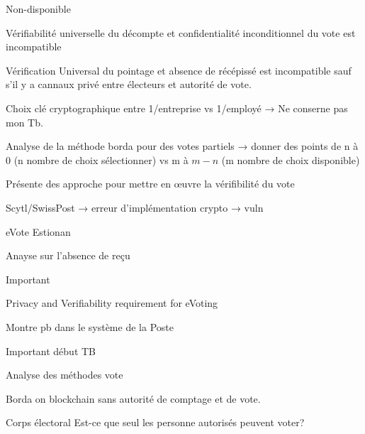 \documentclass[../report]{subfiles}
\begin{document}
  Non-disponible %

  Vérifiabilité universelle du décompte et confidentialité inconditionnel du vote est incompatible

  Vérification Universal du pointage et absence de récépissé est incompatible sauf s'il y a cannaux privé entre électeurs et autorité de vote.


  Choix clé cryptographique entre 1/entreprise vs 1/employé → Ne conserne pas mon Tb.


  Analyse de la méthode borda pour des votes partiels → donner des points de n à 0 (n nombre de choix sélectionner) vs m à $m-n$ (m nombre de choix disponible)


  Présente des approche pour mettre en œuvre la vérifibilité du vote


  Scytl/SwissPost → erreur d'implémentation crypto → vuln



  eVote Estionan



  Anayse sur l'absence de reçu


  Important

  Privacy and Verifiability requirement for eVoting



  Montre pb dans le système de la Poste


  Important début TB

  Analyse des méthodes vote


  Borda on blockchain sans autorité de comptage et de vote.

  \begin{question}{Corps électoral}
    Est-ce que seul les personne autorisés peuvent voter?
  \end{question}
\end{document}
